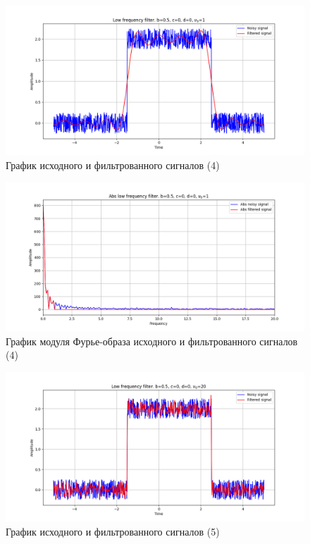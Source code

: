 \documentclass[a4paper, 12pt]{article}
\begin{document}
    \begin{figure}[H]
        \centering
        \includegraphics[scale=0.48]{4_nohigh.png}
        \captionsetup{skip=0pt}
        \caption{График исходного и фильтрованного сигналов (4)}
        \label{fig:fig7}
    \end{figure}
    \begin{figure}[H]
        \centering
        \includegraphics[scale=0.48]{4_abs_nohigh.png}
        \captionsetup{skip=0pt}
        \caption{График модуля Фурье-образа исходного и фильтрованного сигналов (4)}
        \label{fig:fig8}
    \end{figure}
    \begin{figure}[H]
        \centering
        \includegraphics[scale=0.48]{5_nohigh.png}
        \captionsetup{skip=0pt}
        \caption{График исходного и фильтрованного сигналов (5)}
        \label{fig:fig9}
    \end{figure}
\end{document}
